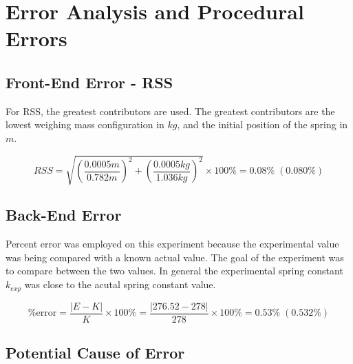 \chapter{Error Analysis and Procedural Errors}

\section{Front-End Error - RSS}

For RSS, the greatest contributors are used. The greatest contributors are 
the lowest weighing mass configuration in $kg$, and the initial position of 
the spring in $m$.
  
  \begin{equation*}
    RSS = \sqrt{\left( \frac{0.0005m}{0.782m} \right)^2 
    + \left( \frac{0.0005kg}{1.036kg} \right)^2} \times 100\% = 0.08\% \; (0.080\%)
  \end{equation*}

\section{Back-End Error}

Percent error was employed on this experiment because the experimental value was 
being compared with a known actual value. The goal of the experiment was to compare 
between the two values. In general the experimental spring constant $k_{exp}$
was close to the acutal spring constant value.

\begin{equation*}
  \% \text{error} = \frac{|E - K|}{K} \times 100 \% = \frac{|276.52 - 278|}{278} \times 100 \% = 0.53 \% \; (0.532 \%)
\end{equation*}


\section{Potential Cause of Error}

